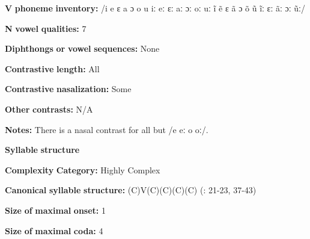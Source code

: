 \documentclass[output=paper]{langsci/langscibook}
\begin{document}
\begin{styleBody}
\textbf{V} \textbf{phoneme} \textbf{inventory:} /i e ɛ a ɔ o u iː eː ɛː aː ɔː oː uː ĩ ẽ ɛ ã ɔ õ ũ ĩː ɛː ãː ɔː ũː/
\end{styleBody}

\begin{styleBody}
\textbf{N} \textbf{vowel} \textbf{qualities:} 7
\end{styleBody}

\begin{styleBody}
\textbf{Diphthongs} \textbf{or} \textbf{vowel} \textbf{sequences:} None
\end{styleBody}

\begin{styleBody}
\textbf{Contrastive} \textbf{length:} All
\end{styleBody}

\begin{styleBody}
\textbf{Contrastive} \textbf{nasalization:} Some
\end{styleBody}

\begin{styleBody}
\textbf{Other} \textbf{contrasts:} N/A
\end{styleBody}

\begin{styleBody}
\textbf{Notes:} There is a nasal contrast for all but /e eː o oː/.
\end{styleBody}

\begin{styleBody}
\textbf{Syllable} \textbf{structure}
\end{styleBody}

\begin{styleBody}
\textbf{Complexity} \textbf{Category:} Highly Complex
\end{styleBody}

\begin{styleBody}
\textbf{Canonical} \textbf{syllable} \textbf{structure:} (C)V(C)(C)(C)(C) (\citealt{WieringWiering1994}: 21-23, 37-43)
\end{styleBody}

\begin{styleBody}
\textbf{Size} \textbf{of} \textbf{maximal} \textbf{onset:} 1
\end{styleBody}

\begin{styleBody}
\textbf{Size} \textbf{of} \textbf{maximal} \textbf{coda:} 4
\end{styleBody}
\end{document}
